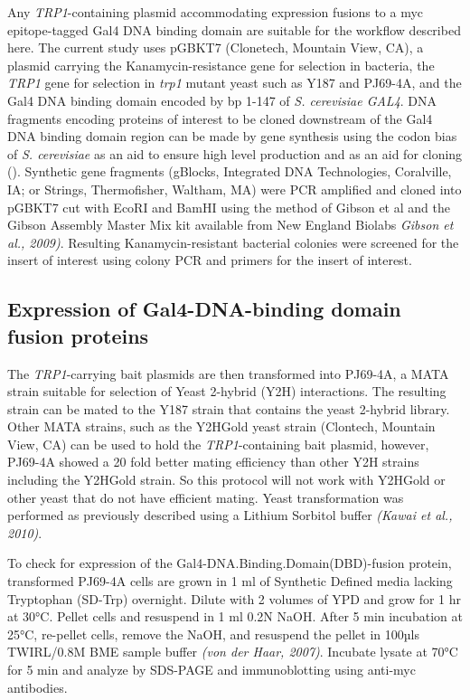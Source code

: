 \documentclass[11pt,fleqn]{book} %
\begin{document}
Any \emph{TRP1}-containing plasmid accommodating expression fusions to a myc epitope-tagged Gal4 DNA binding domain are suitable for the workflow described here.  The current study uses pGBKT7 (Clonetech, Mountain View, CA), a plasmid carrying the Kanamycin-resistance gene for selection in bacteria, the \emph{TRP1} gene for selection in \emph{trp1} mutant yeast such as Y187 and PJ69-4A, and the Gal4 DNA binding domain encoded by bp 1-147 of \emph{S. cerevisiae GAL4}.  DNA fragments encoding proteins of interest to be cloned downstream of the Gal4 DNA binding domain region can be made by gene synthesis using the codon bias of \emph{S. cerevisiae} as an aid to ensure high level production and as an aid for cloning (\cite{ang2016multi}).  Synthetic gene fragments (gBlocks, Integrated DNA Technologies, Coralville, IA; or Strings, Thermofisher, Waltham, MA) were PCR amplified and cloned into pGBKT7 cut with EcoRI and BamHI using the method of Gibson et al and the Gibson Assembly Master Mix kit available from New England Biolabs \emph{Gibson et al., 2009)}.  Resulting Kanamycin-resistant bacterial colonies were screened for the insert of interest using colony PCR and primers for the insert of interest.

\subsection{Expression of Gal4-DNA-binding domain fusion proteins}

The \emph{TRP1}-carrying bait plasmids are then transformed into PJ69-4A, a MATA strain suitable for selection of Yeast 2-hybrid (Y2H) interactions.  The resulting strain can be mated to the Y187 strain that contains the yeast 2-hybrid library.  Other MATA strains, such as the Y2HGold yeast strain (Clontech, Mountain View, CA) can be used to hold the \emph{TRP1}-containing bait plasmid, however, PJ69-4A showed a 20 fold better mating efficiency than other Y2H strains including the Y2HGold strain. So this protocol will not work with Y2HGold or other yeast that do not have efficient mating. Yeast transformation was performed as previously described using a Lithium Sorbitol buffer \emph{(Kawai et al., 2010)}.


To check for expression of the Gal4-DNA.Binding.Domain(DBD)-fusion protein, transformed PJ69-4A cells are grown in 1 ml of Synthetic Defined media lacking Tryptophan (SD-Trp) overnight.  Dilute with 2 volumes of YPD and grow for 1 hr at 30°C.  Pellet cells and resuspend in 1 ml 0.2N NaOH.  After 5 min incubation at 25°C, re-pellet cells, remove the NaOH, and resuspend the pellet in 100µls TWIRL/0.8M BME sample buffer \emph{(von der Haar, 2007)}.  Incubate lysate at 70°C for 5 min and analyze by SDS-PAGE and immunoblotting using anti-myc antibodies.  
\end{document}
